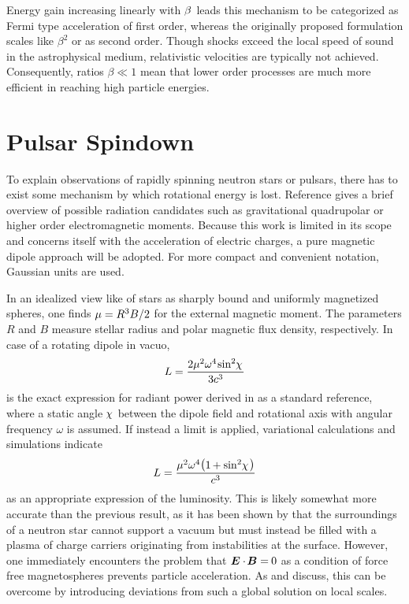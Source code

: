 Energy gain increasing linearly with $\kern-0.5pt \beta \kern+1.0pt$ leads this mechanism to be categorized as Fermi type acceleration
of first order, whereas the originally proposed formulation scales like $\beta^2$ or as second order. Though shocks exceed the local
speed of sound in the astrophysical medium, relativistic velocities are typically not achieved. Consequently, ratios $\beta \ll 1$ mean
that lower order processes are much more efficient in reaching high particle energies.



\newpage



\section{Pulsar Spindown}
\label{sec:spindown}

To explain observations of rapidly spinning neutron stars or pulsars, there has to exist some mechanism by which rotational energy is
lost. Reference \cite{Alvarez_2004} gives a brief overview of possible radiation candidates such as gravitational quadrupolar or
higher order electromagnetic moments. Because this work is limited in its scope and concerns itself with the acceleration of
electric charges, a pure magnetic dipole approach will be adopted. For more compact and convenient notation, Gaussian units are used.

In an idealized view like \cite{Deutsch_1955} of stars as sharply bound and uniformly magnetized spheres, one finds
$\mu = \kern-0.1pt R^3 B / 2$ for the external magnetic moment. The parameters $R$ and $B$ measure stellar radius and polar magnetic
flux density, respectively. In case of a rotating dipole in vacuo,
\begin{equation}
	L = \frac{2\mu^2 \omega^4 \kern-1.0pt \sin^2 \kern-2.0pt \chi \kern+1.0pt}{3c^3}
	\label{eqn:vacuum}
\end{equation}
is the exact expression for radiant power derived in \cite{Jackson_1999} as a standard reference, where a static angle
$\kern-1.0pt \chi \kern+1.0pt$ between the dipole field and rotational axis with angular frequency $\omega$ is assumed. If
instead a  limit is applied, variational calculations \cite{Gruzinov_2006} and  simulations
\cite{Spitkovsky_2006} indicate
\begin{equation}
	L = \frac{\mu^2 \omega^4 \raisebox{0.15ex}{\( \bigl(
	\raisebox{-0.15ex}{\( 1 \kern-0.7pt + \sin^2 \kern-2.0pt \chi \kern+1.0pt \)} \bigr) \)} }{c^3}
	\label{eqn:ffe-mhd}
\end{equation}
as an appropriate expression of the luminosity. This is likely somewhat more accurate than the previous result, as it has been
shown by \cite{Goldreich_1969} that the surroundings of a neutron star cannot support a vacuum but must instead be filled with a
plasma of charge carriers originating from instabilities at the surface. However, one immediately encounters the problem that
$\bm{E} \cdot \kern-1.0pt \bm{B} = \kern-0.5pt 0$ as a condition of force free magnetospheres prevents particle acceleration. As
\cite{Li_2012} and \cite{Gralla_2019} discuss, this can be overcome by introducing deviations from such a global solution on local
scales.

